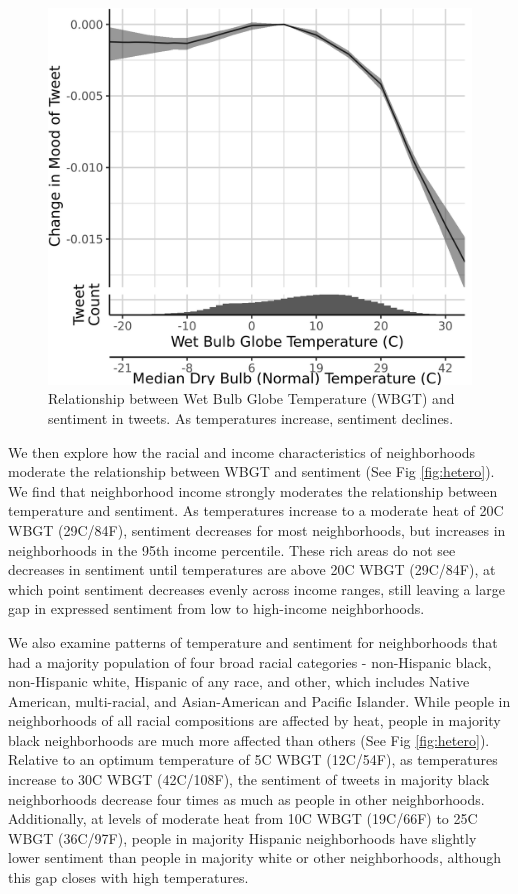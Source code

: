 \documentclass[fleqn,10pt]{wlscirep}
\begin{document}
\begin{figure}[H]
  \centering
  \includegraphics[width=0.5\linewidth]{../res/wbgt.png}
  \caption{Relationship between Wet Bulb Globe Temperature (WBGT) and sentiment in tweets.  As temperatures increase, sentiment declines.}
  \label{fig:wbgt}
\end{figure}

We then explore how the racial and income characteristics of neighborhoods moderate the relationship between WBGT and sentiment (See Fig \ref{fig:hetero}).  We find that neighborhood income strongly moderates the relationship between temperature and sentiment.  As temperatures increase to a moderate heat of 20\textdegree C WBGT (29\textdegree C/84\textdegree F), sentiment decreases for most neighborhoods, but increases in neighborhoods in the 95th income percentile.  These rich areas do not see decreases in sentiment until temperatures are above 20\textdegree C WBGT (29\textdegree C/84\textdegree F), at which point sentiment decreases evenly across income ranges, still leaving a large gap in expressed sentiment from low to high-income neighborhoods.

We also examine patterns of temperature and sentiment for neighborhoods that had a majority population of four broad racial categories - non-Hispanic black, non-Hispanic white, Hispanic of any race, and other, which includes Native American, multi-racial, and Asian-American and Pacific Islander.  While people in neighborhoods of all racial compositions are affected by heat, people in majority black neighborhoods are much more affected than others  (See Fig \ref{fig:hetero}).  Relative to an optimum temperature of 5\textdegree C WBGT (12\textdegree C/54\textdegree F), as temperatures increase to 30\textdegree C WBGT (42\textdegree C/108\textdegree F), the sentiment of tweets in majority black neighborhoods decrease four times as much as people in other neighborhoods.  Additionally, at levels of moderate heat from 10\textdegree C WBGT (19\textdegree C/66\textdegree F) to 25\textdegree C WBGT (36\textdegree C/97\textdegree F), people in majority Hispanic neighborhoods have slightly lower sentiment than people in majority white or other neighborhoods, although this gap closes with high temperatures.
\end{document}
